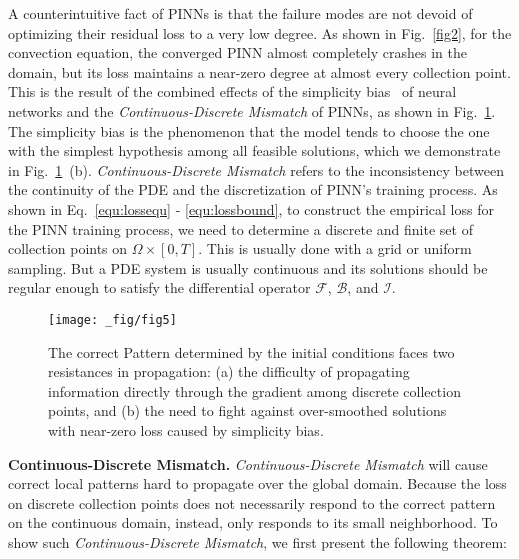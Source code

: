 A counterintuitive fact of PINNs is that the failure modes are not devoid of optimizing their residual loss to a very low degree.
As shown in Fig.~\ref{fig2}, for the convection equation, the converged PINN almost completely crashes in the domain, but its loss maintains a near-zero degree at almost every collection point. This is the result of the combined effects of the simplicity bias~\cite{shah2020pitfalls,pezeshki2021gradient} of neural networks and the \textit{Continuous-Discrete Mismatch} of PINNs, as shown in Fig.~\ref{fig5}. 
    The simplicity bias is the phenomenon that the model tends to choose the one with the simplest hypothesis among all feasible solutions, which we demonstrate in Fig.~\ref{fig5}~(b).
        \textit{Continuous-Discrete Mismatch} refers to the inconsistency between the continuity of the PDE and the discretization of PINN's training process.
As shown in Eq.~\ref{equ:lossequ} - \ref{equ:lossbound}, to construct the empirical loss for the PINN training process, we need to determine a discrete and finite set of collection points on $\Omega\times[0,T]$. 
This is usually done with a grid or uniform sampling. But a PDE system is usually continuous and its solutions should be regular enough to satisfy the differential operator $\mathcal F$, $\mathcal B$, and $\mathcal I$.

\begin{figure}[t!]
    \centering
    \texttt{[image: \_fig/fig5]}    \vspace{-3mm}
    \caption{The correct Pattern determined by the initial conditions faces two resistances in propagation: (a) the difficulty of propagating information directly through the gradient among discrete collection points, and (b) the need to fight against over-smoothed solutions with near-zero loss caused by simplicity bias.}
    \label{fig5}
    \vspace{-3mm}
\end{figure}

\textbf{Continuous-Discrete Mismatch.} \textit{Continuous-Discrete Mismatch} will cause correct local patterns hard to propagate over the global domain.
Because the loss on discrete collection points does not necessarily respond to the correct pattern on the continuous domain, instead, only responds to its small neighborhood. %
To show such \textit{Continuous-Discrete Mismatch}, we first present the following theorem:

